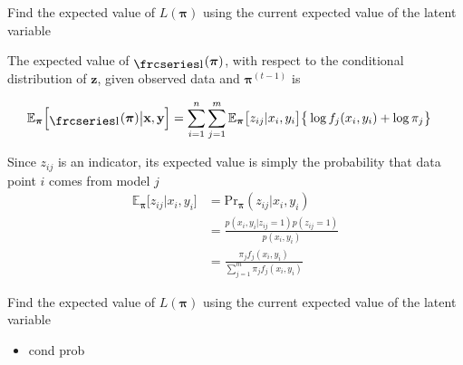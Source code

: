 \documentclass{beamer}
\newcommand{\textfrc}[1]{{\frcseries#1}}
\newcommand{\mathfrc}[1]{\raisebox{-0.8mm}{\text{\textfrc{\small #1}}}\hspace{0.4mm}}
\newcommand{\eqn}[1]{\begin{align*}
#1
\end{align*}}
\newcommand{\vect}[1]{\boldsymbol{\mathbf{#1}}}
\newcommand{\bl}{\big\{}
\newcommand{\br}{\big\}}
\newcommand{\vx}{\vect{x}}
\newcommand{\vy}{\vect{y}}
\newcommand{\vp}{\vect{\pi}}
\newcommand{\sumn}{\sum^n_{i=1}}
\newcommand{\summ}{\sum^m_{j=1}}
\newcommand{\fab}{f_j}
\newcommand{\llp}{\mathfrc{l}(\vect{\pi})}
\begin{document}
\begin{frame}{Find the expected value of $L(\vect{\pi})$ using the current expected value of the latent variable}
	
	The expected value of $\llp$, with respect to the conditional distribution of $\vect{z}$, given observed data and $\vp^{(t-1)}$ is
	
	\eqn{
		\mathbb{E}_{\vp}\Big[\llp \big| \vx,\vy \Big] &= \sumn \summ \mathbb{E}_{\vp}\big[z_{ij}|x_i,y_i\big] \bl \log \fab(x_i,y_i) + \log \pi_j  \br
	}
	
	Since $z_{ij}$ is an indicator, its expected value is simply the probability that data point $i$ comes from model $j$
	\eqn{
		\mathbb{E}_{\vp}\Big[  z_{ij} | x_i, y_i \Big]	&= \text{Pr}_{\vp}(z_{ij}|x_i,y_i)	\\
										&= \frac{p(x_i,y_i|z_{ij}=1)p(z_{ij}=1)}{p(x_i,y_i)}	\\
										&=  \frac{\pi_j \fab(x_i,y_i)  }{\summ \pi_j \fab(x_i,y_i)}
	}
\end{frame}
\begin{frame}[shrink]{Find the expected value of $L(\vect{\pi})$ using the current expected value of the latent variable}
	
	\begin{itemize}
		\item cond prob
	\end{itemize}
	
\end{frame}
\end{document}

